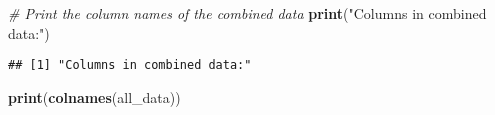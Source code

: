 \documentclass[
]{article}
\newenvironment{Shaded}{\begin{snugshade}}{\end{snugshade}}
\newcommand{\CommentTok}[1]{\textcolor[rgb]{0.56,0.35,0.01}{\textit{#1}}}
\newcommand{\FunctionTok}[1]{\textcolor[rgb]{0.13,0.29,0.53}{\textbf{#1}}}
\newcommand{\NormalTok}[1]{#1}
\newcommand{\StringTok}[1]{\textcolor[rgb]{0.31,0.60,0.02}{#1}}
\begin{document}
\begin{Shaded}
\begin{Highlighting}[]
\CommentTok{\# Print the column names of the combined data}
\FunctionTok{print}\NormalTok{(}\StringTok{"Columns in combined data:"}\NormalTok{)}
\end{Highlighting}
\end{Shaded}

\begin{verbatim}
## [1] "Columns in combined data:"
\end{verbatim}

\begin{Shaded}
\begin{Highlighting}[]
\FunctionTok{print}\NormalTok{(}\FunctionTok{colnames}\NormalTok{(all\_data))}
\end{Highlighting}
\end{Shaded}
\end{document}
